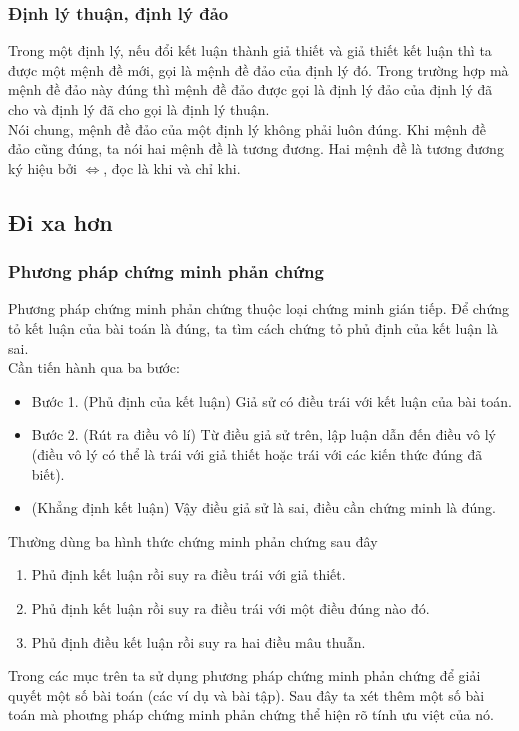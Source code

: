 \subsubsection{Định lý thuận, định lý đảo} 
Trong một định lý, nếu đổi kết luận thành giả thiết và giả thiết kết luận thì ta được một mệnh đề mới, gọi là mệnh đề đảo của định lý đó. Trong trường hợp mà mệnh đề đảo này đúng thì mệnh đề đảo được gọi là định lý đảo của định lý đã cho và định lý đã cho gọi là định lý thuận.\\
Nói chung, mệnh đề đảo của một định lý không phải luôn đúng. Khi mệnh đề đảo cũng đúng, ta nói hai mệnh đề là tương đương. Hai mệnh đề là tương đương ký hiệu bởi $\Leftrightarrow$, đọc là khi và chỉ khi.
\subsection{Đi xa hơn}
\subsubsection{Phương pháp chứng minh phản chứng}
Phương pháp chứng minh phản chứng thuộc loại chứng minh gián tiếp. Để chứng tỏ kết luận của bài toán là đúng, ta tìm cách chứng tỏ phủ định của kết luận là sai.\\
Cần tiến hành qua ba bước:
	\begin{itemize}
	\item  Bước 1. (Phủ định của kết luận) Giả sử có điều trái với kết luận của bài toán.
	\item  Bước 2. (Rút ra điều vô lí) Từ điều giả sử trên, lập luận dẫn đến điều vô lý (điều vô lý có thể là trái với giả thiết hoặc trái với các kiến thức đúng đã biết).
	\item (Khẳng định kết luận) Vậy điều giả sử là sai, điều cần chứng minh là đúng. 
\end{itemize}
Thường dùng ba hình thức chứng minh phản chứng sau đây
	\begin{enumerate}[1.]
	\item Phủ định kết luận rồi suy ra điều trái với giả thiết.
	\item Phủ định kết luận rồi suy ra  điều trái với một điều đúng nào đó.
	\item Phủ định điều kết luận rồi suy ra hai điều mâu thuẫn.
\end{enumerate}
 Trong các mục trên ta  sử dụng phương pháp chứng minh phản chứng để giải quyết một số bài toán (các ví dụ và bài tập). Sau đây ta xét thêm một số bài toán mà phoưng pháp chứng minh phản chứng thể hiện rõ tính ưu việt của nó.
